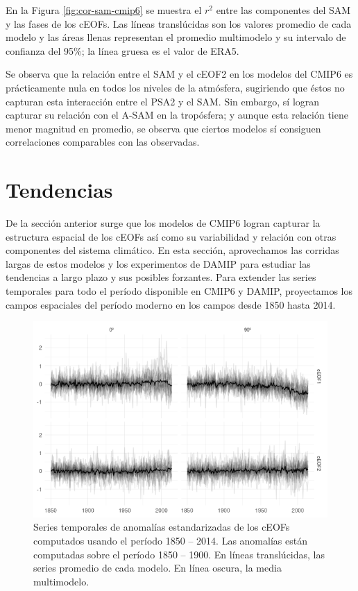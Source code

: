 \documentclass[12pt,oneside]{reedthesis}
\begin{document}
En la Figura \ref{fig:cor-sam-cmip6} se muestra el \(r^2\) entre las componentes del SAM y las fases de los cEOFs.
Las líneas translúcidas son los valores promedio de cada modelo y las áreas llenas representan el promedio multimodelo y su intervalo de confianza del 95\%; la línea gruesa es el valor de ERA5.

Se observa que la relación entre el SAM y el cEOF2 en los modelos del CMIP6 es prácticamente nula en todos los niveles de la atmósfera, sugiriendo que éstos no capturan esta interacción entre el PSA2 y el SAM.
Sin embargo, sí logran capturar su relación con el A-SAM en la tropósfera; y aunque esta relación tiene menor magnitud en promedio, se observa que ciertos modelos sí consiguen correlaciones comparables con las observadas.

\hypertarget{tendencias}{%
\section{Tendencias}\label{tendencias}}

De la sección anterior surge que los modelos de CMIP6 logran capturar la estructura espacial de los cEOFs así como su variabilidad y relación con otras componentes del sistema climático.
En esta sección, aprovechamos las corridas largas de estos modelos y los experimentos de DAMIP para estudiar las tendencias a largo plazo y sus posibles forzantes.
Para extender las series temporales para todo el período disponible en CMIP6 y DAMIP, proyectamos los campos espaciales del período moderno en los campos desde 1850 hasta 2014.

\begin{figure}
\includegraphics{figures/50-cmip6/series-largas-1} \caption{Series temporales de anomalías estandarizadas de los cEOFs computados usando el período 1850 -- 2014. Las anomalías están computadas sobre el período 1850 -- 1900. En líneas translúcidas, las series promedio de cada modelo. En línea oscura, la media multimodelo.}\label{fig:series-largas}
\end{figure}
\end{document}
